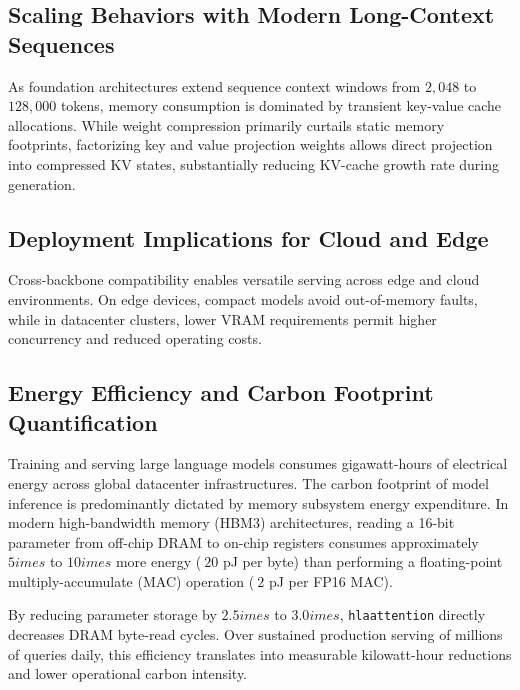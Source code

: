 \subsection{Scaling Behaviors with Modern Long-Context Sequences}
As foundation architectures extend sequence context windows from $2{,}048$ to $128{,}000$ tokens, memory consumption is dominated by transient key-value cache allocations. While weight compression primarily curtails static memory footprints, factorizing key and value projection weights allows direct projection into compressed KV states, substantially reducing KV-cache growth rate during generation.

\subsection{Deployment Implications for Cloud and Edge}
Cross-backbone compatibility enables versatile serving across edge and cloud environments. On edge devices, compact models avoid out-of-memory faults, while in datacenter clusters, lower VRAM requirements permit higher concurrency and reduced operating costs.

\subsection{Energy Efficiency and Carbon Footprint Quantification}
Training and serving large language models consumes gigawatt-hours of electrical energy across global datacenter infrastructures. The carbon footprint of model inference is predominantly dictated by memory subsystem energy expenditure. In modern high-bandwidth memory (HBM3) architectures, reading a 16-bit parameter from off-chip DRAM to on-chip registers consumes approximately $5	imes$ to $10	imes$ more energy ($~20$ pJ per byte) than performing a floating-point multiply-accumulate (MAC) operation ($~2$ pJ per FP16 MAC).

By reducing parameter storage by $2.5	imes$ to $3.0	imes$, \texttt{hlaattention} directly decreases DRAM byte-read cycles. Over sustained production serving of millions of queries daily, this efficiency translates into measurable kilowatt-hour reductions and lower operational carbon intensity.

